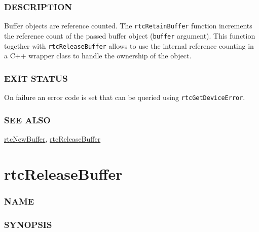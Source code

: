 \subsubsection{DESCRIPTION}\label{description}

Buffer objects are reference counted. The \texttt{rtcRetainBuffer}
function increments the reference count of the passed buffer object
(\texttt{buffer} argument). This function together with
\texttt{rtcReleaseBuffer} allows to use the internal reference counting
in a C++ wrapper class to handle the ownership of the object.

\subsubsection{EXIT STATUS}\label{exit-status}

On failure an error code is set that can be queried using
\texttt{rtcGetDeviceError}.

\subsubsection{SEE ALSO}\label{see-also}

\hyperref[rtcnewbuffer]{rtcNewBuffer},
\hyperref[rtcreleasebuffer]{rtcReleaseBuffer}

\pagebreak

\section{rtcReleaseBuffer}\label{rtcreleasebuffer}

\subsubsection{NAME}\label{name}

\begin{Shaded}
\begin{Highlighting}[]
\OperatorTok{{-}}
\end{Highlighting}
\end{Shaded}

\subsubsection{SYNOPSIS}\label{synopsis}

\begin{Shaded}
\begin{Highlighting}[]

\OperatorTok{(}\OperatorTok{);}
\end{Highlighting}
\end{Shaded}

